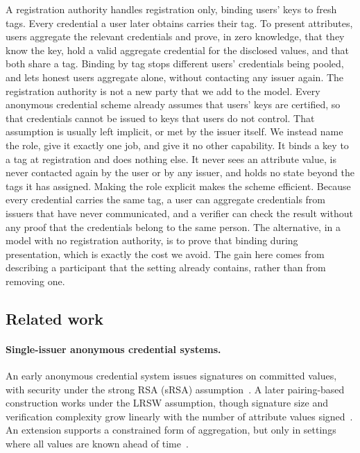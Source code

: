 A registration authority handles registration only, binding users' keys to
fresh tags. Every credential a user later obtains carries their tag. To present
attributes, users aggregate the relevant credentials and prove, in zero
knowledge, that they know the key, hold a valid aggregate credential for the
disclosed values, and that both share a tag. Binding by tag stops
different users' credentials being pooled, and lets honest users aggregate
alone, without contacting any issuer again.  The registration authority is not a
new party that we add to the model. Every anonymous credential scheme already
assumes that users' keys are certified, so that credentials cannot be issued to
keys that users do not control. That assumption is usually left implicit, or
met by the issuer itself. We instead name the role, give it exactly one
job, and give it no other capability. It binds a key to a tag at registration
and does nothing else. It never sees an attribute value, is never contacted
again by the user or by any issuer, and holds no state beyond the tags it has
assigned. Making the role explicit makes the scheme efficient. Because
every credential carries the same tag, a user can aggregate credentials from
issuers that have never communicated, and a verifier can check the result
without any proof that the credentials belong to the same person. The
alternative, in a model with no registration authority, is to prove that binding
during presentation, which is exactly the cost we avoid. The gain here comes
from describing a participant that the setting already contains, rather than
from removing one.

\subsection*{Related work}

\paragraph{Single-issuer anonymous credential systems.} An early anonymous
credential system issues signatures on committed values, with security under the
strong RSA (sRSA) assumption~\cite{EC:CamLys01,SCN:CamLys02}. A later pairing-based
construction works under the LRSW assumption, though signature size and
verification complexity grow linearly with the number of attribute values
signed~\cite{C:CamLys04}. An extension supports a constrained form of
aggregation, but only in settings where all values are known ahead of
time~\cite{FC:LeeLeeYun13}.

